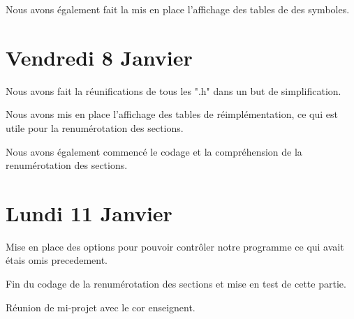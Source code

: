 \documentclass[12pt, a4paper]{article}
\begin{document}
Nous avons également fait la mis en place l’affichage des tables de des 
symboles.

\section{Vendredi 8 Janvier}

Nous avons fait la réunifications de tous les ".h" dans un but de 
simplification.

Nous avons mis en place l’affichage des tables de r\'eimplémentation, ce qui 
est utile pour la renumérotation des sections.

Nous avons également commencé le codage et  la compréhension de la 
renumérotation des sections. 

\section{Lundi 11 Janvier}

Mise en place des options pour pouvoir contrôler notre programme ce qui avait 
étais omis precedement.

Fin du codage de la renumérotation des sections et mise en test de cette partie.

Réunion de mi-projet avec le cor enseignent.
\end{document}
